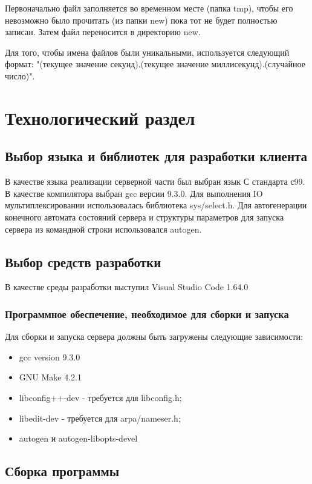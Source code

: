 \documentclass[a4paper,12pt]{report}
\begin{document}
Первоначально файл заполняется во временном месте (папка tmp), чтобы его невозможно было прочитать (из папки new) пока тот не будет полностью записан. Затем файл переносится в директорию new. 

Для того, чтобы имена файлов были уникальными, используется следующий формат: "(текущее значение секунд).(текущее значение миллисекунд).(случайное число)".



\chapter{Технологический раздел}

\section{Выбор языка и библиотек для разработки клиента}
В качестве языка реализации серверной части был выбран язык С стандарта с99. В качестве компилятора выбран gcc версии 9.3.0. Для выполнения IO мультиплексировании использовалась библиотека sys/select.h. Для автогенерации конечного автомата состояний сервера и структуры параметров для запуска сервера из командной строки использовался autogen.

\section{Выбор средств разработки}
В качестве среды разработки выступил Visual Studio Code 1.64.0

\subsection{Программное обеспечение, необходимое для сборки и запуска}
Для сборки и запуска сервера должны быть загружены следующие зависимости:

\begin{itemize} 
    \item gcc version 9.3.0
    \item GNU Make 4.2.1
    \item libconfig++-dev - требуется для libconfig.h;
    \item libedit-dev - требуется для arpa/nameser.h;
    \item autogen и autogen-libopts-devel
\end{itemize} 

\section{Сборка программы}
\end{document}
